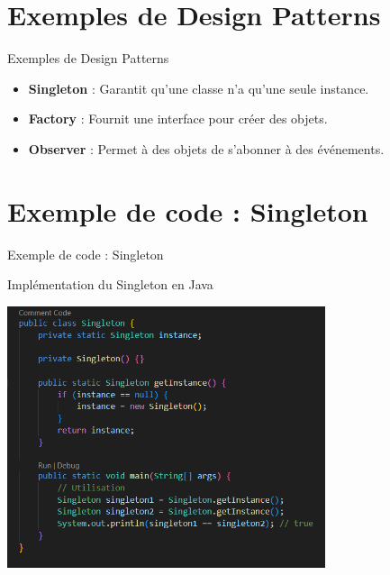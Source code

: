 \documentclass{clbeamer2024}
\begin{document}
	
	\section{Exemples de Design Patterns}
	\begin{frame}{Exemples de Design Patterns}
		\begin{itemize}
			\item \textbf{Singleton} : Garantit qu'une classe n'a qu'une seule instance.
			\item \textbf{Factory} : Fournit une interface pour créer des objets.
			\item \textbf{Observer} : Permet à des objets de s'abonner à des événements.
		\end{itemize}
	\end{frame}
	
	
	\section{Exemple de code : Singleton}
	\begin{frame}{Exemple de code : Singleton}
		\begin{exampleblock}{Implémentation du Singleton en Java}
			
			\begin{center}
				\includegraphics[width=0.7\textwidth]{images/code1.png}
			\end{center}
		
		\end{exampleblock}
	\end{frame}
	
	
\end{document}

